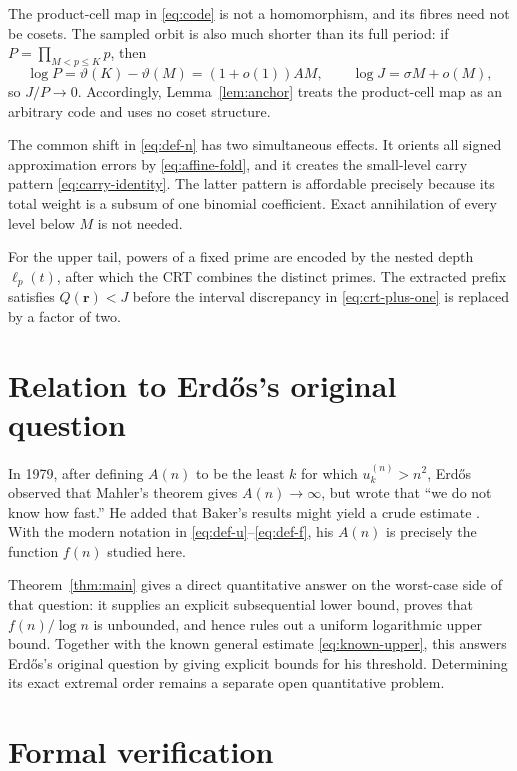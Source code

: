 \documentclass[11pt]{article}
\theoremstyle{remark}
\begin{document}
The product-cell map in \eqref{eq:code} is not a homomorphism, and its
fibres need not be cosets.  The sampled orbit is also much shorter than its
full period: if
\(P=\prod_{M<p\leq K}p\), then
\[
 \log P=\vartheta(K)-\vartheta(M)=(1+o(1))AM,
 \qquad
 \log J=\sigma M+o(M),
\]
so \(J/P\to0\).  Accordingly, Lemma~\ref{lem:anchor} treats the product-cell
map as an arbitrary code and uses no coset structure.

The common shift in \eqref{eq:def-n} has two simultaneous effects.  It
orients all signed approximation errors by \eqref{eq:affine-fold}, and it
creates the small-level carry pattern \eqref{eq:carry-identity}.  The latter
pattern is affordable precisely because its total weight is a subsum of one
binomial coefficient.  Exact annihilation of every level below \(M\) is not
needed.

For the upper tail, powers of a fixed prime are encoded by the nested depth
\(\ell_p(t)\), after which the CRT combines the distinct primes.  The
extracted prefix satisfies \(Q(\mathbf r)<J\) before the interval discrepancy
in \eqref{eq:crt-plus-one} is replaced by a factor of two.

\section{Relation to Erd\H{o}s's original question}

In 1979, after defining \(A(n)\) to be the least \(k\) for which
\(u_k^{(n)}>n^2\), Erd\H{o}s observed that Mahler's theorem gives
\(A(n)\to\infty\), but wrote that ``we do not know how fast.''  He added that
Baker's results might yield a crude estimate \cite[pp.~76--77]{Erdos1979}.  With
the modern notation in \eqref{eq:def-u}--\eqref{eq:def-f}, his \(A(n)\) is
precisely the function \(f(n)\) studied here.

Theorem~\ref{thm:main} gives a direct quantitative answer on the worst-case
side of that question: it supplies an explicit subsequential lower bound,
proves that \(f(n)/\log n\) is unbounded, and hence rules out a uniform
logarithmic upper bound.  Together with the known general estimate
\eqref{eq:known-upper}, this answers Erd\H{o}s's original question by giving
explicit bounds for his threshold.  Determining its exact extremal order
remains a separate open quantitative problem.

\section{Formal verification}\label{sec:formal}
\end{document}
